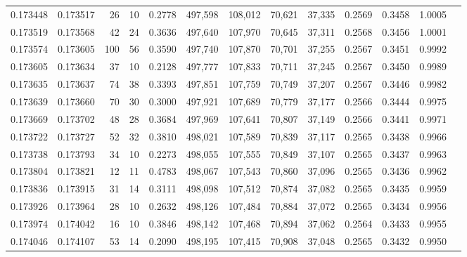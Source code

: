\begin{tabular}{rrrrrrrrrrrrr}
0.173448 & 0.173517 &    26 &  10 &                                     0.2778 & 497,598 & 108,012 &  70,621 &  37,335 & 0.2569 & 0.3458 & 1.0005 \\
0.173519 & 0.173568 &    42 &  24 &                                     0.3636 & 497,640 & 107,970 &  70,645 &  37,311 & 0.2568 & 0.3456 & 1.0001 \\
0.173574 & 0.173605 &   100 &  56 &                                     0.3590 & 497,740 & 107,870 &  70,701 &  37,255 & 0.2567 & 0.3451 & 0.9992 \\
0.173605 & 0.173634 &    37 &  10 &                                     0.2128 & 497,777 & 107,833 &  70,711 &  37,245 & 0.2567 & 0.3450 & 0.9989 \\
0.173635 & 0.173637 &    74 &  38 &                                     0.3393 & 497,851 & 107,759 &  70,749 &  37,207 & 0.2567 & 0.3446 & 0.9982 \\
0.173639 & 0.173660 &    70 &  30 &                                     0.3000 & 497,921 & 107,689 &  70,779 &  37,177 & 0.2566 & 0.3444 & 0.9975 \\
0.173669 & 0.173702 &    48 &  28 &                                     0.3684 & 497,969 & 107,641 &  70,807 &  37,149 & 0.2566 & 0.3441 & 0.9971 \\
0.173722 & 0.173727 &    52 &  32 &                                     0.3810 & 498,021 & 107,589 &  70,839 &  37,117 & 0.2565 & 0.3438 & 0.9966 \\
0.173738 & 0.173793 &    34 &  10 &                                     0.2273 & 498,055 & 107,555 &  70,849 &  37,107 & 0.2565 & 0.3437 & 0.9963 \\
0.173804 & 0.173821 &    12 &  11 &                                     0.4783 & 498,067 & 107,543 &  70,860 &  37,096 & 0.2565 & 0.3436 & 0.9962 \\
0.173836 & 0.173915 &    31 &  14 &                                     0.3111 & 498,098 & 107,512 &  70,874 &  37,082 & 0.2565 & 0.3435 & 0.9959 \\
0.173926 & 0.173964 &    28 &  10 &                                     0.2632 & 498,126 & 107,484 &  70,884 &  37,072 & 0.2565 & 0.3434 & 0.9956 \\
0.173974 & 0.174042 &    16 &  10 &                                     0.3846 & 498,142 & 107,468 &  70,894 &  37,062 & 0.2564 & 0.3433 & 0.9955 \\
0.174046 & 0.174107 &    53 &  14 &                                     0.2090 & 498,195 & 107,415 &  70,908 &  37,048 & 0.2565 & 0.3432 & 0.9950 \\

\end{tabular}
